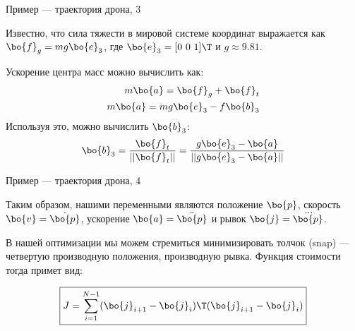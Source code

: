 \begin{frame}{Пример — траектория дрона, 3}
	\begin{flushleft}
		
		Известно, что сила тяжести в мировой системе координат выражается как $\bo{f}_g = mg \bo{e}_3$, где $\bo{e}_3 = [0 \ 0 \ 1 ]\T$ и $g \approx 9.81$.
		
		\bigskip
		
		Ускорение центра масс можно вычислить как:
		\begin{align}
			m \bo{a} = \bo{f}_g + \bo{f}_t 
			\\
			m \bo{a} = mg \bo{e}_3 - f \bo{b}_3 
		\end{align}
		Используя это, можно вычислить $\bo{b}_3$:
		\begin{align}
			\bo{b}_3 = \frac{\bo{f}_t}{||\bo{f}_t||} =  \frac{g \bo{e}_3 - \bo{a}}{||g \bo{e}_3 - \bo{a}||}
		\end{align}
		
		
		
	\end{flushleft}
\end{frame}


\begin{frame}{Пример — траектория дрона, 4}
	\begin{flushleft}
		
		Таким образом, нашими переменными являются положение $\bo{p}$, скорость $\bo{v} = \dot{\bo{p}}$, ускорение $\bo{a} = \ddot{\bo{p}}$ и рывок $\bo{j} = \dddot{\bo{p}}$. 

\bigskip

В нашей оптимизации мы можем стремиться минимизировать толчок (snap) — четвертую производную положения, производную рывка. Функция стоимости тогда примет вид:

\begin{equation}
	\boxed{
		J = \sum_{i = 1}^{N-1} ( \bo{j}_{i+1} - \bo{j}_i)\T ( \bo{j}_{i+1} - \bo{j}_i) }
\end{equation}


\end{flushleft}
\end{frame}

